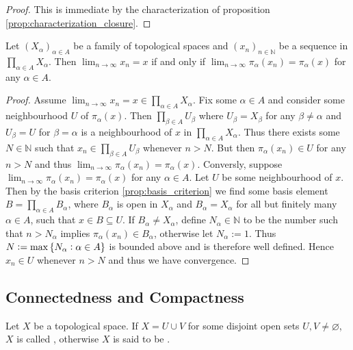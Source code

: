 \begin{proof}
	This is immediate by the characterization of proposition \ref{prop:characterization_closure}.
\end{proof}

\begin{proposition}
	Let $(X_\alpha)_{\alpha \in A}$ be a family of topological spaces and $(x_n)_{n \in \mathbb{N}}$ be a sequence in $\prod_{\alpha \in A} X_\alpha$. Then $\lim_{n \to \infty}x_n = x$ if and only if $\lim_{n \to \infty} \pi_\alpha(x_n) = \pi_\alpha(x)$ for any $\alpha \in A$.
	\label{prop:convergence_product}
\end{proposition}

\begin{proof}
	Assume $\lim_{n \to \infty} x_n = x \in \prod_{\alpha \in A}X_\alpha$. Fix some $\alpha \in A$ and consider some neighbourhood $U$ of $\pi_\alpha(x)$. Then $\prod_{\beta \in A} U_\beta$ where $U_\beta = X_\beta$ for any $\beta \neq \alpha$ and $U_\beta = U$ for $\beta = \alpha$ is a neighbourhood of $x$ in $\prod_{\alpha \in A} X_\alpha$. Thus there exists some $N \in \mathbb{N}$ such that $x_n \in \prod_{\beta \in A} U_\beta$ whenever $n > N$. But then $\pi_\alpha(x_n) \in U$ for any $n > N$ and thus $\lim_{n \to \infty} \pi_\alpha(x_n) = \pi_\alpha(x)$. Conversly, suppose $\lim_{n \to \infty} \pi_\alpha(x_n) = \pi_\alpha(x)$ for any $\alpha \in A$. Let $U$ be some neighbourhood of $x$. Then by the basis criterion \ref{prop:basis_criterion} we find some basis element $B = \prod_{\alpha \in A} B_\alpha$, where $B_\alpha$ is open in $X_\alpha$ and $B_\alpha = X_\alpha$ for all but finitely many $\alpha \in A$, such that $x \in B \subseteq U$. If $B_\alpha \neq X_\alpha$, define $N_\alpha \in \mathbb{N}$ to be the number such that $n > N_\alpha$ implies $\pi_\alpha(x_n) \in B_\alpha$, otherwise let $N_\alpha := 1$. Thus $N:=\max\cbr[0]{N_\alpha : \alpha \in A}$ is bounded above and is therefore well defined. Hence $x_n \in U$ whenever $n > N$ and thus we have convergence.	
\end{proof}

\subsection{Connectedness and Compactness}

\begin{definition}
	Let $X$ be a topological space. If $X = U \cup V$ for some disjoint open sets $U,V \neq \varnothing$, $X$ is called , otherwise $X$ is said to be .
\end{definition}

